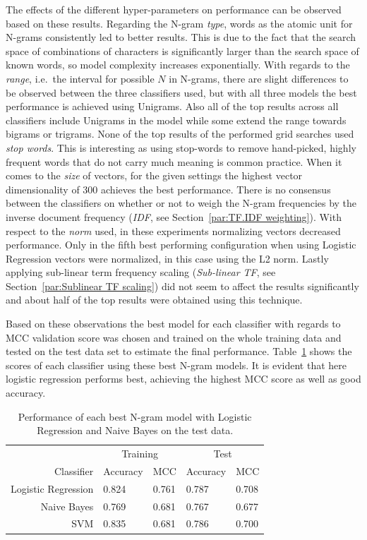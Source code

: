 The effects of the different hyper-parameters on performance can be observed based on these results. Regarding the N-gram \emph{type}, words as the atomic unit for N-grams consistently led to better results. This is due to the fact that the search space of combinations of characters is significantly larger than the search space of known words, so model complexity increases exponentially.
With regards to the \emph{range}, i.e.\ the interval for possible $N$ in N-grams, there are slight differences to be observed between the three classifiers used, but with all three models the best performance is achieved using Unigrams. Also all of the top results across all classifiers include Unigrams in the model while some extend the range towards bigrams or trigrams.
None of the top results of the performed grid searches used \emph{stop words}. This is interesting as using stop-words to remove hand-picked, highly frequent words that do not carry much meaning is common practice.
When it comes to the \emph{size} of vectors, for the given settings the highest vector dimensionality of 300 achieves the best performance.
There is no consensus between the classifiers on whether or not to weigh the N-gram frequencies by the inverse document frequency (\emph{IDF}, see Section~\ref{par:TF.IDF weighting}). With respect to the \emph{norm} used, in these experiments normalizing vectors decreased performance. Only in the fifth best performing configuration when using Logistic Regression vectors were normalized, in this case using the L2 norm.
Lastly applying sub-linear term frequency scaling (\emph{Sub-linear TF}, see Section~\ref{par:Sublinear TF scaling}) did not seem to affect the results significantly and about half of the top results were obtained using this technique.

Based on these observations the best model for each classifier with regards to \gls{MCC} validation score was chosen and trained on the whole training data and tested on the test data set to estimate the final performance. Table~\ref{tab:Ngram Grid Search Scores} shows the scores of each classifier using these best N-gram models. It is evident that here logistic regression performs best, achieving the highest \gls{MCC} score as well as good accuracy.

\begin{table}
  \begin{center}
  \begin{tabular}{ r | *2l | *2l }
    \toprule
     & \multicolumn{2}{c|}{Training} & \multicolumn{2}{c}{Test}\\
    Classifier & Accuracy & MCC & Accuracy & MCC \\
    \midrule
    Logistic Regression & 0.824 & 0.761 & 0.787 & 0.708 \\
    Naive Bayes         & 0.769 & 0.681 & 0.767 & 0.677 \\
    SVM                 & 0.835 & 0.681 & 0.786 & 0.700 \\
    \bottomrule
  \end{tabular}
  \caption{Performance of each best N-gram model with Logistic Regression and Naive Bayes on the test data.}
\label{tab:Ngram Grid Search Scores}
\end{center}
\end{table}


